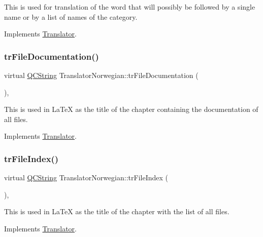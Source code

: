 This is used for translation of the word that will possibly be followed by a single name or by a list of names of the category. 

Implements \mbox{\hyperlink{class_translator}{Translator}}.

\mbox{\label{class_translator_norwegian_a8c2958c015db8ddd54a00387e6a5faad}} 
\subsubsection{\texorpdfstring{trFileDocumentation()}{trFileDocumentation()}}
{\footnotesize\ttfamily virtual \mbox{\hyperlink{class_q_c_string}{Q\+C\+String}} Translator\+Norwegian\+::tr\+File\+Documentation (\begin{DoxyParamCaption}{ }\end{DoxyParamCaption})\hspace{0.3cm}{\ttfamily [inline]}, {\ttfamily [virtual]}}

This is used in La\+TeX as the title of the chapter containing the documentation of all files. 

Implements \mbox{\hyperlink{class_translator}{Translator}}.

\mbox{\label{class_translator_norwegian_a2fe4f0090ea4b14ab7624ea3ced45e64}} 
\subsubsection{\texorpdfstring{trFileIndex()}{trFileIndex()}}
{\footnotesize\ttfamily virtual \mbox{\hyperlink{class_q_c_string}{Q\+C\+String}} Translator\+Norwegian\+::tr\+File\+Index (\begin{DoxyParamCaption}{ }\end{DoxyParamCaption})\hspace{0.3cm}{\ttfamily [inline]}, {\ttfamily [virtual]}}

This is used in La\+TeX as the title of the chapter with the list of all files. 

Implements \mbox{\hyperlink{class_translator}{Translator}}.

